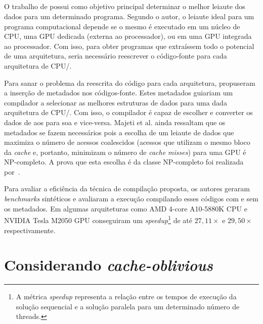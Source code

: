 \subsection{}

O trabalho de  possui como objetivo principal determinar o melhor leiaute dos dados para um determinado programa. Segundo o autor, o leiaute ideal para um programa computacional depende se o mesmo é executado em um núcleo de CPU, uma GPU dedicada (externa ao processador), ou em uma GPU integrada ao processador. Com isso, para obter programas que extraíssem todo o potencial de uma arquitetura, seria necessário reescrever o código-fonte para cada arquitetura de CPU\@/\@GPU.

Para sanar o problema da reescrita do código para cada arquitetura,  propuseram a inserção de metadados nos códigos-fonte. Estes metadados guiariam um compilador a selecionar as melhores estruturas de dados para uma dada arquitetura de CPU\@/\@GPU. Com isso, o compilador é capaz de escolher e converter os dados de \ac{aos} para \ac{soa} e vice-versa.
Majeti et al. ainda ressaltam que os metadados se fazem necessários pois a escolha de um leiaute de dados que maximiza o número de acessos coalescidos (acessos que utilizam o mesmo bloco da \textit{cache} e, portanto, minimizam o número de \textit{cache misses}) para uma GPU é NP-completo. A prova que esta escolha é da classe NP-completo foi realizada por~.


Para avaliar a eficiência da técnica de compilação proposta, os autores geraram \textit{benchmarks} sintéticos e avaliaram a execução compilando esses códigos com e sem os metadados. Em algumas arquiteturas como AMD 4-core A10-5880K CPU e NVIDIA Tesla M2050 GPU conseguiram um \textit{speedup}\footnote{A métrica \textit{speedup} representa a relação entre os tempos de execução da solução sequencial e a solução paralela para um determinado número de threads.} de até $27,11 \times$ e $29,50 \times$ respectivamente.

\section{Considerando \textit{cache-oblivious}}
\label{sec:trabalhos_cache_oblivous}

